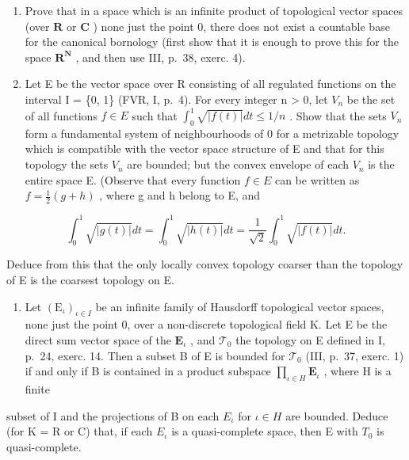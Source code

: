 \begin{enumerate}
\def\labelenumi{\arabic{enumi})}
\setcounter{enumi}{7}
\item
  Prove that in a space which is an infinite product of topological vector spaces (over \(\mathbf{R}\) or \(\mathbf{C}\) ) none just the point 0, there does not exist a countable base for the canonical bornology (first show that it is enough to prove this for the space \(\mathbf{R}^{\mathbf{N}}\) , and then use III, p.~38, exerc. 4).
\item
  Let E be the vector space over R consisting of all regulated functions on the interval I = \{0, 1\} (FVR, I, p.~4). For every integer n \textgreater{} 0, let \(V_{n}\) be the set of all functions \(f \in E\) such that \(\int_{0}^{1} \sqrt{|f(t)|} dt \leqslant 1/n\) . Show that the sets \(V_{n}\) form a fundamental system of neighbourhoods of 0 for a metrizable topology which is compatible with the vector space structure of E and that for this topology the sets \(V_{n}\) are bounded; but the convex envelope of each \(V_{n}\) is the entire space E. (Observe that every function \(f \in E\) can be written as \(f = \frac{1}{2}(g + h)\) , where g and h belong to E, and
\end{enumerate}

\[
\int_ {0} ^ {1} \sqrt {| g (t) |} d t = \int_ {0} ^ {1} \sqrt {| h (t) |} d t = \frac {1}{\sqrt {2}} \int_ {0} ^ {1} \sqrt {| f (t) |} d t.
\]

Deduce from this that the only locally convex topology coarser than the topology of E is the coarsest topology on E.

\begin{enumerate}
\def\labelenumi{\arabic{enumi})}
\setcounter{enumi}{9}
\tightlist
\item
  Let \((\mathrm{E}_{\iota})_{\iota \in I}\) be an infinite family of Hausdorff topological vector spaces, none just the point 0, over a non-discrete topological field K. Let E be the direct sum vector space of the \(\mathbf{E}_{\iota}\) , and \(\mathcal{T}_0\) the topology on E defined in I, p.~24, exerc. 14. Then a subset B of E is bounded for \(\mathcal{T}_0\) (III, p.~37, exerc. 1) if and only if B is contained in a product subspace \(\prod_{\iota \in H} \mathbf{E}_{\iota}\) , where H is a finite
\end{enumerate}

subset of I and the projections of B on each \(E_{\iota}\) for \(\iota \in H\) are bounded. Deduce (for K = R or C) that, if each \(E_{\iota}\) is a quasi-complete space, then E with \(T_{0}\) is quasi-complete.

